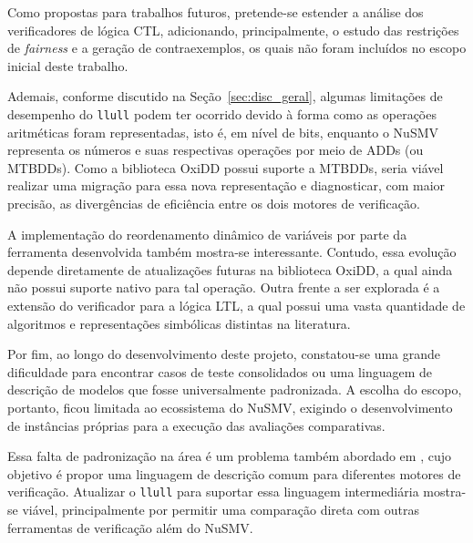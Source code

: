 \documentclass[cic,tc]{infufrgs}
\begin{document}
	Como propostas para trabalhos futuros, pretende-se estender a análise dos verificadores de lógica CTL, adicionando, principalmente, o estudo das restrições de \textit{fairness} e a geração de contraexemplos, os quais não foram incluídos no escopo inicial deste trabalho.
	
	Ademais, conforme discutido na Seção~\ref{sec:disc_geral}, algumas limitações de desempenho do \texttt{llull} podem ter ocorrido devido à forma como as operações aritméticas foram representadas, isto é, em nível de bits, enquanto o NuSMV representa os números e suas respectivas operações por meio de ADDs (ou MTBDDs). Como a biblioteca OxiDD possui suporte a MTBDDs, seria viável realizar uma migração para essa nova representação e diagnosticar, com maior precisão, as divergências de eficiência entre os dois motores de verificação.
	
	A implementação do reordenamento dinâmico de variáveis por parte da ferramenta desenvolvida também mostra-se interessante. Contudo, essa evolução depende diretamente de atualizações futuras na biblioteca OxiDD, a qual ainda não possui suporte nativo para tal operação. Outra frente a ser explorada é a extensão do verificador para a lógica LTL, a qual possui uma vasta quantidade de algoritmos e representações simbólicas distintas na literatura.
	
	Por fim, ao longo do desenvolvimento deste projeto, constatou-se uma grande dificuldade para encontrar casos de teste consolidados ou uma linguagem de descrição de modelos que fosse universalmente padronizada. A escolha do escopo, portanto, ficou limitada ao ecossistema do NuSMV, exigindo o desenvolvimento de instâncias próprias para a execução das avaliações comparativas.
	
	Essa falta de padronização na área é um problema também abordado em , cujo objetivo é propor uma linguagem de descrição comum para diferentes motores de verificação. Atualizar o \texttt{llull} para suportar essa linguagem intermediária mostra-se viável, principalmente por permitir uma comparação direta com outras ferramentas de verificação além do NuSMV.
	
	
	
	
\end{document}
